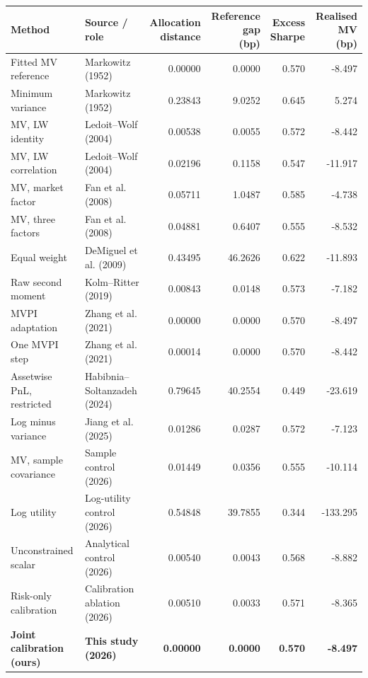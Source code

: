 \begin{tabular}{@{}p{}p{}rrrr@{}}\toprule
Method & Source / role & \shortstack{Allocation\\distance} & \shortstack{Reference gap\\(bp)} & \shortstack{Excess\\Sharpe} & \shortstack{Realised MV\\(bp)}\\\midrule
Fitted MV reference & Markowitz (1952) & 0.00000 & 0.0000 & 0.570 & -8.497 \\
Minimum variance & Markowitz (1952) & 0.23843 & 9.0252 & 0.645 & 5.274 \\
MV, LW identity & Ledoit--Wolf (2004) & 0.00538 & 0.0055 & 0.572 & -8.442 \\
MV, LW correlation & Ledoit--Wolf (2004) & 0.02196 & 0.1158 & 0.547 & -11.917 \\
MV, market factor & Fan et al. (2008) & 0.05711 & 1.0487 & 0.585 & -4.738 \\
MV, three factors & Fan et al. (2008) & 0.04881 & 0.6407 & 0.555 & -8.532 \\
Equal weight & DeMiguel et al. (2009) & 0.43495 & 46.2626 & 0.622 & -11.893 \\
Raw second moment & Kolm--Ritter (2019) & 0.00843 & 0.0148 & 0.573 & -7.182 \\
MVPI adaptation & Zhang et al. (2021) & 0.00000 & 0.0000 & 0.570 & -8.497 \\
One MVPI step & Zhang et al. (2021) & 0.00014 & 0.0000 & 0.570 & -8.442 \\
Assetwise PnL, restricted & Habibnia--Soltanzadeh (2024) & 0.79645 & 40.2554 & 0.449 & -23.619 \\
Log minus variance & Jiang et al. (2025) & 0.01286 & 0.0287 & 0.572 & -7.123 \\
MV, sample covariance & Sample control (2026) & 0.01449 & 0.0356 & 0.555 & -10.114 \\
Log utility & Log-utility control (2026) & 0.54848 & 39.7855 & 0.344 & -133.295 \\
Unconstrained scalar & Analytical control (2026) & 0.00540 & 0.0043 & 0.568 & -8.882 \\
Risk-only calibration & Calibration ablation (2026) & 0.00510 & 0.0033 & 0.571 & -8.365 \\
\midrule
\textbf{Joint calibration (ours)} & \textbf{This study (2026)} & \textbf{0.00000} & \textbf{0.0000} & \textbf{0.570} & \textbf{-8.497} \\
\bottomrule\end{tabular}
